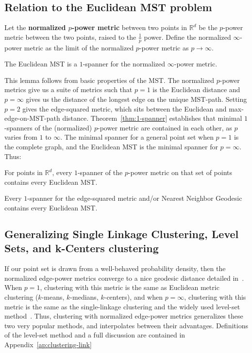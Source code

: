 \subsection{Relation to the Euclidean MST problem}
  \begin{definition}
  Let the \textbf{normalized $p$-power metric} between two points in
  $\mathbb{R}^d$ be the $p$-power metric between the two points,
  raised to the $\frac{1}{p}$ power. Define the normalized $\infty$-power
  metric as the limit of the normalized $p$-power metric as $p \rightarrow \infty$.
  \end{definition}
  \begin{lemma} The Euclidean MST is a
  $1$-spanner for the normalized $\infty$-power metric.
  \end{lemma}
  This lemma follows from basic properties of the MST.
  The normalized $p$-power metrics give us a suite of
  metrics such that $p=1$ is the Euclidean
  distance and $p=\infty$ gives us the distance of the longest edge on the
  unique MST-path.  Setting $p=2$ gives the edge-squared metric, which
  sits between the Euclidean and max-edge-on-MST-path distance. 
  Theorem~\ref{thm:1-spanner} establishes
  that minimal $1$-spanners of the (normalized) $p$-power
  metric are contained in each other, as $p$ varies from
  $1$ to $\infty$. The minimal spanner for a general point set when $p=1$ is the complete graph, and
 the Euclidean MST is the minimal spanner for $p=\infty$. Thus:
  \begin{theorem} 
    For points in $\mathbb{R}^d$, every $1$-spanner of the $p$-power
    metric on that set of points contains every Euclidean MST.
  \end{theorem}
  \begin{corollary}
    Every $1$-spanner for the edge-squared metric and/or Nearest
    Neighbor Geodesic contains every Euclidean
    MST. 
  \end{corollary}
  \subsection{Generalizing Single Linkage Clustering, Level Sets, and k-Centers
  clustering}
  If our point set is drawn from a well-behaved probability
  density, then the normalized edge-power metrics
  converge to a nice geodesic distance detailed
  in~\cite{hwang2016}. When $p=1$, clustering with this metric is
  the same as Euclidean metric clustering ($k$-means,
  $k$-medians, $k$-centers), and when $p=\infty$, clustering with
  this metric is the same as the single-linkage clustering and the widely
used level-set method~\cite{Wishart69, Gower1969, Ester1996,OPTICS96}.
Thus, clustering with normalized edge-power metrics generalizes these two
very popular methods, and interpolates between their advantages.
Definitions of the level-set method and a full discussion are contained in
Appendix~\ref{ap:clustering-link}

